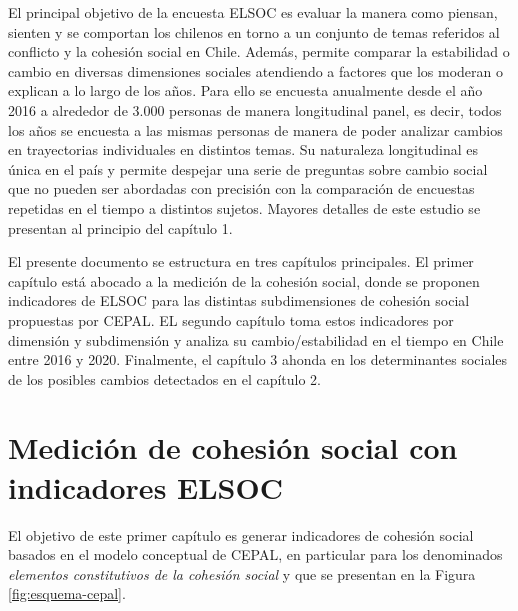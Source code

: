 \documentclass[
  12pt,
]{book}
\begin{document}
El principal objetivo de la encuesta ELSOC es evaluar la manera como piensan, sienten y se comportan los chilenos en torno a un conjunto de temas referidos al conflicto y la cohesión social en Chile. Además, permite comparar la estabilidad o cambio en diversas dimensiones sociales atendiendo a factores que los moderan o explican a lo largo de los años. Para ello se encuesta anualmente desde el año 2016 a alrededor de 3.000 personas de manera longitudinal panel, es decir, todos los años se encuesta a las mismas personas de manera de poder analizar cambios en trayectorias individuales en distintos temas. Su naturaleza longitudinal es única en el país y permite despejar una serie de preguntas sobre cambio social que no pueden ser abordadas con precisión con la comparación de encuestas repetidas en el tiempo a distintos sujetos. Mayores detalles de este estudio se presentan al principio del capítulo 1.

El presente documento se estructura en tres capítulos principales. El primer capítulo está abocado a la medición de la cohesión social, donde se proponen indicadores de ELSOC para las distintas subdimensiones de cohesión social propuestas por CEPAL. EL segundo capítulo toma estos indicadores por dimensión y subdimensión y analiza su cambio/estabilidad en el tiempo en Chile entre 2016 y 2020. Finalmente, el capítulo 3 ahonda en los determinantes sociales de los posibles cambios detectados en el capítulo 2.

\hypertarget{mediciuxf3n-de-cohesiuxf3n-social-con-indicadores-elsoc}{%
\chapter{Medición de cohesión social con indicadores ELSOC}\label{mediciuxf3n-de-cohesiuxf3n-social-con-indicadores-elsoc}}

El objetivo de este primer capítulo es generar indicadores de cohesión social basados en el modelo conceptual de CEPAL, en particular para los denominados \emph{elementos constitutivos de la cohesión social} y que se presentan en la Figura \ref{fig:esquema-cepal}.
\end{document}
